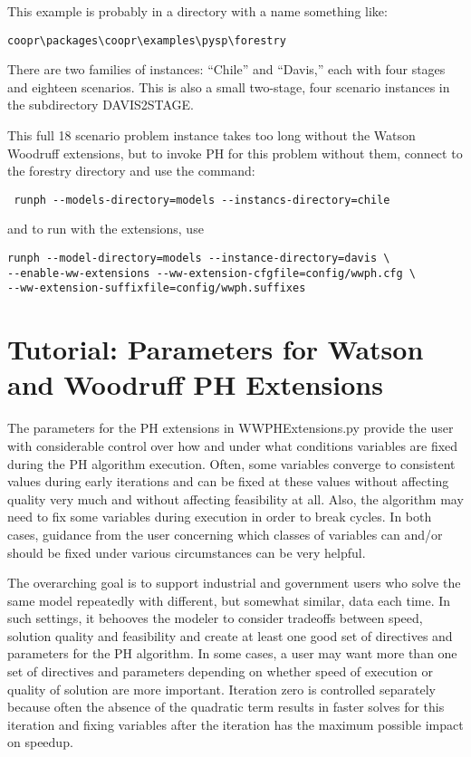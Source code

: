 This example is probably in a directory with a name something like:

\begin{verbatim}
coopr\packages\coopr\examples\pysp\forestry
\end{verbatim}


There are two families of instances: ``Chile'' and ``Davis,'' each with four stages and eighteen scenarios. This is also a small
two-stage, four scenario instances in the subdirectory DAVIS2STAGE.

This full 18 scenario problem instance takes too long without the Watson Woodruff extensions, but to
invoke PH for this problem without them, connect to the forestry directory and use the command:

\begin{verbatim}
 runph --models-directory=models --instancs-directory=chile
\end{verbatim}
and to run with the extensions, use
\begin{verbatim}
runph --model-directory=models --instance-directory=davis \
--enable-ww-extensions --ww-extension-cfgfile=config/wwph.cfg \
--ww-extension-suffixfile=config/wwph.suffixes
\end{verbatim}


\section{Tutorial: Parameters for Watson and Woodruff PH Extensions \label{WWTutorialSec}}

The parameters for the PH extensions in WWPHExtensions.py provide the user with considerable control over
how and under what conditions variables are fixed during the PH algorithm execution. Often, some variables converge
to consistent values during early iterations and can be fixed at these values without affecting quality very much and without
affecting feasibility at all. Also, the algorithm may need to fix some variables during execution in order to break cycles.
In both cases, guidance from the user concerning which classes of variables can and/or should be fixed under various circumstances can be very helpful.

The overarching goal is to support industrial and government users who solve the same model repeatedly with different, but
somewhat similar, data each time. In such settings, it behooves the modeler to consider tradeoffs between speed, solution quality
and feasibility and create at least one good set of directives and parameters for the PH algorithm. In some cases, a user may want more than
one set of directives and parameters depending on whether speed of execution or quality of solution are more important. Iteration zero is controlled separately because often the absence of the quadratic term results in faster solves for this
iteration and fixing variables after the iteration has the maximum possible impact on speedup.

